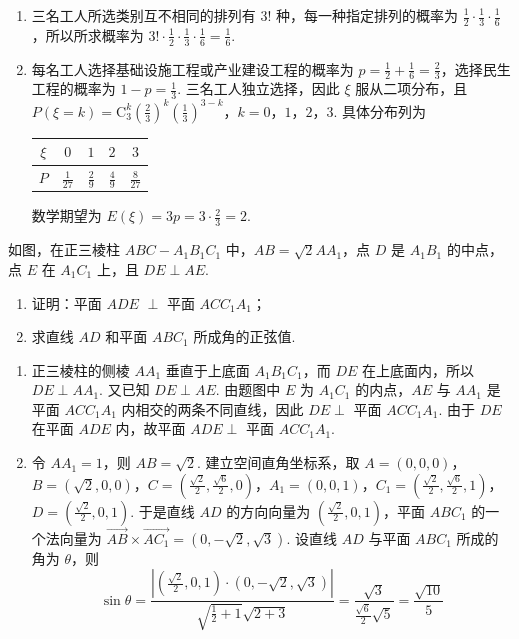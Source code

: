 \begin{solution}
\begin{enumerate}
\item 三名工人所选类别互不相同的排列有 \(3!\) 种，每一种指定排列的概率为 \(\frac12\cdot\frac13\cdot\frac16\)，所以所求概率为 \(3!\cdot\frac12\cdot\frac13\cdot\frac16=\frac16\).
\item 每名工人选择基础设施工程或产业建设工程的概率为 \(p=\frac12+\frac16=\frac23\)，选择民生工程的概率为 \(1-p=\frac13\). 三名工人独立选择，因此 \(\xi\) 服从二项分布，且 \(P(\xi=k)=\mathrm C_3^k\left(\frac23\right)^k\left(\frac13\right)^{3-k}\)，\(k=0\)，\(1\)，\(2\)，\(3\). 具体分布列为
\begin{center}
\begin{tabular}{c|cccc}
\(\xi\) & \(0\) & \(1\) & \(2\) & \(3\)\\
\hline
\(P\) & \(\frac1{27}\) & \(\frac2{9}\) & \(\frac4{9}\) & \(\frac8{27}\)
\end{tabular}
\end{center}
数学期望为 \(E(\xi)=3p=3\cdot\frac23=2\).
\end{enumerate}
\end{solution}

\begin{problem}
如图，在正三棱柱 \(ABC - A_{1}B_{1}C_{1}\) 中，\(AB = \sqrt{2}AA_{1}\)，点 \(D\) 是 \(A_{1}B_{1}\) 的中点，点 \(E\) 在 \(A_{1}C_{1}\) 上，且 \(DE \perp AE\).
\begin{enumerate}
\item 证明：平面 \(ADE\) \(\perp\) 平面 \(ACC_{1}A_{1}\)；
\item 求直线 \(AD\) 和平面 \(ABC_{1}\) 所成角的正弦值.
\end{enumerate}

\end{problem}

\begin{solution}
\begin{enumerate}
\item 正三棱柱的侧棱 \(AA_1\) 垂直于上底面 \(A_1B_1C_1\)，而 \(DE\) 在上底面内，所以 \(DE\perp AA_1\). 又已知 \(DE\perp AE\). 由题图中 \(E\) 为 \(A_1C_1\) 的内点，\(AE\) 与 \(AA_1\) 是平面 \(ACC_1A_1\) 内相交的两条不同直线，因此 \(DE\perp\) 平面 \(ACC_1A_1\). 由于 \(DE\) 在平面 \(ADE\) 内，故平面 \(ADE\perp\) 平面 \(ACC_1A_1\).
\item 令 \(AA_1=1\)，则 \(AB=\sqrt2\). 建立空间直角坐标系，取 \(A=(0,0,0)\)，\(B=(\sqrt2,0,0)\)，\(C=\left(\frac{\sqrt2}{2},\frac{\sqrt6}{2},0\right)\)，\(A_1=(0,0,1)\)，\(C_1=\left(\frac{\sqrt2}{2},\frac{\sqrt6}{2},1\right)\)，\(D=\left(\frac{\sqrt2}{2},0,1\right)\). 于是直线 \(AD\) 的方向向量为 \(\left(\frac{\sqrt2}{2},0,1\right)\)，平面 \(ABC_1\) 的一个法向量为 \(\overrightarrow{AB}\times\overrightarrow{AC_1}=(0,-\sqrt2,\sqrt3)\). 设直线 \(AD\) 与平面 \(ABC_1\) 所成的角为 \(\theta\)，则
\[
\sin\theta=\frac{\left|\left(\frac{\sqrt2}{2},0,1\right)\cdot(0,-\sqrt2,\sqrt3)\right|}{\sqrt{\frac12+1}\sqrt{2+3}}=\frac{\sqrt3}{\frac{\sqrt6}{2}\sqrt5}=\frac{\sqrt{10}}5
\]
\end{enumerate}
\end{solution}

